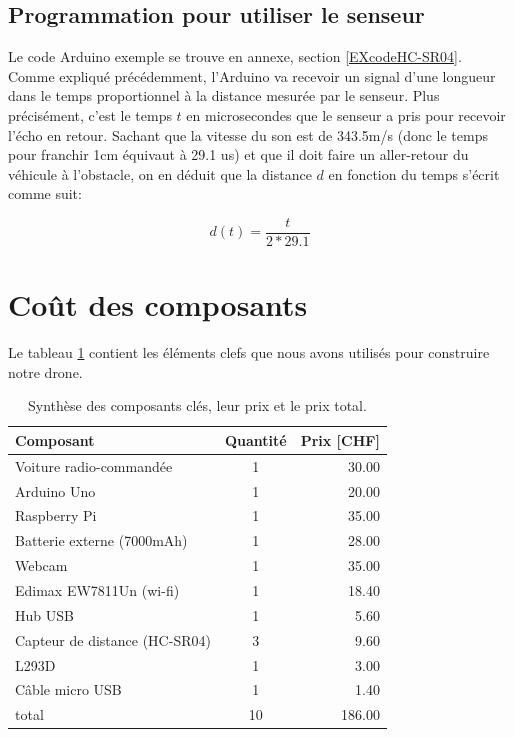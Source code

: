 \documentclass[a4paper,11pt]{report}
\begin{document}
{\begin{enumerate}
\begin{enumerate}
\subsection{Programmation pour utiliser le senseur}

Le code Arduino exemple se trouve en annexe, section \ref{EXcodeHC-SR04}. Comme expliqué précédemment, l'Arduino va recevoir un signal d'une longueur dans le temps proportionnel à la distance mesurée par le senseur. Plus pré\-ci\-sé\-ment, c'est le temps $t$ en microsecondes que le senseur a pris pour recevoir l'écho en retour. Sachant que la vitesse du son est de 343.5m/s (donc le temps pour franchir 1cm équivaut à 29.1 us)  et que il doit faire un aller-retour du véhicule à l'obstacle, on en déduit que la distance $d$ en fonction du temps s'écrit comme suit:

\begin{equation}
d(t)=\frac{t}{2*29.1}
\end{equation}


\section{Coût des composants}
Le tableau \ref{TableCout} contient les éléments clefs que nous avons utilisés pour construire notre drone.

\begin{center}
\begin{table}[h]
\begin{tabular}{| l | c | r |}
\hline
Composant & Quantité & Prix [CHF] \\
\hline
Voiture radio-commandée & 1 & 30.00\\
\hline
Arduino Uno & 1 & 20.00 \\
\hline
Raspberry Pi& 1 & 35.00 \\
\hline
Batterie externe (7000mAh) &1 & 28.00 \\
\hline
Webcam & 1 & 35.00\\
\hline
Edimax EW7811Un (wi-fi) & 1 & 18.40\\
\hline
Hub USB & 1 & 5.60\\
\hline
Capteur de distance (HC-SR04) & 3 & 9.60\\
\hline
L293D & 1 & 3.00\\
\hline
Câble micro USB & 1 & 1.40\\
\hline


\hline
\hline
total & 10 & 186.00\\
\hline

\end{tabular}
\caption{\label{TableCout}Synthèse des composants clés, leur prix et le prix total.}
\end{table}
\end{center}






\end{enumerate}
\end{enumerate}}
\end{document}
